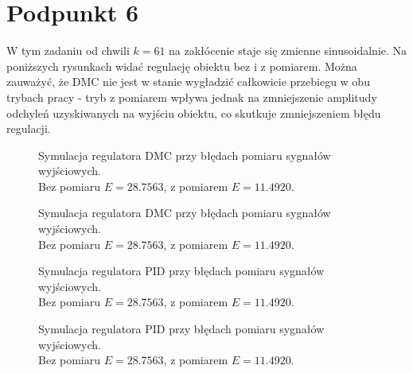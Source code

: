 \begin{figure}[ht]
\centering

\label{Z5a}
\end{figure}

\begin{figure}[ht]
\centering

\label{Z5a}
\end{figure}

\begin{figure}[ht]
\centering

\label{Z5a}
\end{figure}

\begin{figure}[ht]
\centering

\label{Z5a}
\end{figure}


\chapter{Podpunkt 6}
W tym zadaniu od chwili $ k = \num{61} $ na zakłócenie staje się zmienne sinusoidalnie. Na poniższych rysunkach widać regulację obiektu bez i z pomiarem. Można zauważyć, że DMC nie jest w stanie wygładzić całkowicie przebiegu w obu trybach pracy - tryb z pomiarem wpływa jednak na zmniejszenie amplitudy odchyleń uzyskiwanych na wyjściu obiektu, co skutkuje zmniejszeniem błędu regulacji. 

\begin{figure}[ht]
\centering

\caption{Symulacja regulatora DMC przy błędach pomiaru sygnałów wyjściowych.\\Bez pomiaru $ E = \num{28,7563} $, z pomiarem $ E = \num{11,4920} $.}
\label{Z6a}
\end{figure}

\begin{figure}[ht]
\centering

\caption{Symulacja regulatora DMC przy błędach pomiaru sygnałów wyjściowych.\\Bez pomiaru $ E = \num{28,7563} $, z pomiarem $ E = \num{11,4920} $.}
\label{Z6a}
\end{figure}

\begin{figure}[ht]
\centering

\caption{Symulacja regulatora PID przy błędach pomiaru sygnałów wyjściowych.\\Bez pomiaru $ E = \num{28,7563} $, z pomiarem $ E = \num{11,4920} $.}
\label{Z6a}
\end{figure}

\begin{figure}[ht]
\centering

\caption{Symulacja regulatora PID przy błędach pomiaru sygnałów wyjściowych.\\Bez pomiaru $ E = \num{28,7563} $, z pomiarem $ E = \num{11,4920} $.}
\label{Z6a}
\end{figure}

